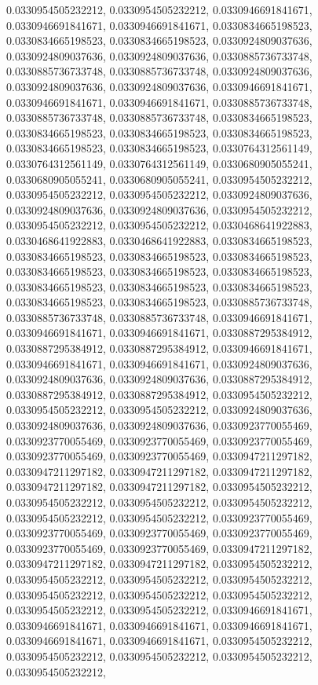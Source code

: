 \documentclass[
  ,man]{apa6}
\begin{document}
0.0330954505232212, 0.0330954505232212, 0.0330946691841671, 0.0330946691841671, 0.0330946691841671, 0.0330834665198523, 0.0330834665198523, 0.0330834665198523, 0.0330924809037636, 0.0330924809037636, 0.0330924809037636, 0.0330885736733748, 0.0330885736733748, 0.0330885736733748, 0.0330924809037636, 0.0330924809037636, 0.0330924809037636, 0.0330946691841671, 0.0330946691841671, 0.0330946691841671, 0.0330885736733748, 0.0330885736733748, 0.0330885736733748, 0.0330834665198523, 0.0330834665198523, 0.0330834665198523,
0.0330834665198523, 0.0330834665198523, 0.0330834665198523, 0.0330764312561149, 0.0330764312561149, 0.0330764312561149, 0.0330680905055241, 0.0330680905055241, 0.0330680905055241, 0.0330954505232212, 0.0330954505232212, 0.0330954505232212, 0.0330924809037636, 0.0330924809037636, 0.0330924809037636, 0.0330954505232212, 0.0330954505232212, 0.0330954505232212, 0.0330468641922883, 0.0330468641922883, 0.0330468641922883, 0.0330834665198523, 0.0330834665198523, 0.0330834665198523, 0.0330834665198523, 0.0330834665198523,
0.0330834665198523, 0.0330834665198523, 0.0330834665198523, 0.0330834665198523, 0.0330834665198523, 0.0330834665198523, 0.0330834665198523, 0.0330885736733748, 0.0330885736733748, 0.0330885736733748, 0.0330946691841671, 0.0330946691841671, 0.0330946691841671, 0.0330887295384912, 0.0330887295384912, 0.0330887295384912, 0.0330946691841671, 0.0330946691841671, 0.0330946691841671, 0.0330924809037636, 0.0330924809037636, 0.0330924809037636, 0.0330887295384912, 0.0330887295384912, 0.0330887295384912, 0.0330954505232212,
0.0330954505232212, 0.0330954505232212, 0.0330924809037636, 0.0330924809037636, 0.0330924809037636, 0.0330923770055469, 0.0330923770055469, 0.0330923770055469, 0.0330923770055469, 0.0330923770055469, 0.0330923770055469, 0.0330947211297182, 0.0330947211297182, 0.0330947211297182, 0.0330947211297182, 0.0330947211297182, 0.0330947211297182, 0.0330954505232212, 0.0330954505232212, 0.0330954505232212, 0.0330954505232212, 0.0330954505232212, 0.0330954505232212, 0.0330923770055469, 0.0330923770055469, 0.0330923770055469,
0.0330923770055469, 0.0330923770055469, 0.0330923770055469, 0.0330947211297182, 0.0330947211297182, 0.0330947211297182, 0.0330954505232212, 0.0330954505232212, 0.0330954505232212, 0.0330954505232212, 0.0330954505232212, 0.0330954505232212, 0.0330954505232212, 0.0330954505232212, 0.0330954505232212, 0.0330946691841671, 0.0330946691841671, 0.0330946691841671, 0.0330946691841671, 0.0330946691841671, 0.0330946691841671, 0.0330954505232212, 0.0330954505232212, 0.0330954505232212, 0.0330954505232212, 0.0330954505232212,
\end{document}
